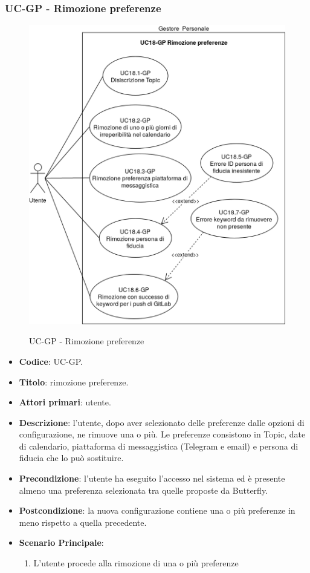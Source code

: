 \subsubsection{UC\theuccount-GP - Rimozione preferenze}
		\begin{figure}[H]
			\centering
				\includegraphics[width=\textwidth]{img/casi_d'uso/UC18.png}\\
			\caption{UC\theuccount-GP - Rimozione preferenze}
		\end{figure}
	\begin{itemize}
		\item \textbf{Codice}: UC\theuccount-GP.
		\item \textbf{Titolo}: rimozione preferenze.
		\item \textbf{Attori primari}: utente.
		\item \textbf{Descrizione}: l’utente, dopo aver selezionato delle preferenze dalle opzioni di configurazione, ne rimuove una o più. Le preferenze consistono in Topic, date di calendario, piattaforma di messaggistica (Telegram e email) e persona di fiducia che lo può sostituire.
		\item \textbf{Precondizione}: l’utente ha eseguito l'accesso nel sistema ed è presente almeno	una preferenza selezionata tra quelle proposte da Butterfly.
		\item \textbf{Postcondizione}: la nuova configurazione contiene una o più preferenze in meno rispetto	a quella precedente.
		\item \textbf{Scenario Principale}:
		\begin{enumerate}
			\item L'utente procede alla rimozione di una o più preferenze
		\end{enumerate}
	\end{itemize}

